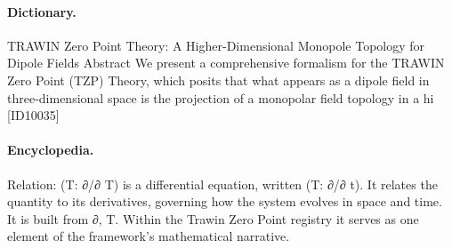 \paragraph{Dictionary.}
TRAWIN Zero Point Theory: A Higher-Dimensional Monopole Topology for Dipole Fields Abstract We present a comprehensive formalism for the TRAWIN Zero Point (TZP) Theory, which posits that what appears as a dipole field in three-dimensional space is the projection of a monopolar field topology in a hi [ID10035]

\paragraph{Encyclopedia.}
Relation: (T: ∂/∂ T) is a differential equation, written (T: ∂/∂ t). It relates the quantity to its derivatives, governing how the system evolves in space and time. It is built from ∂, T. Within the Trawin Zero Point registry it serves as one element of the framework's mathematical narrative.
